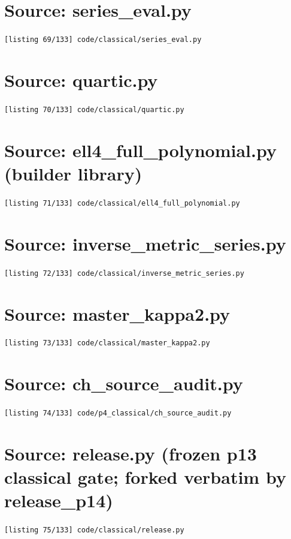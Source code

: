 \section{Source: series\_eval.py}
\noindent\texttt{[listing 69/133] code/classical/series\_eval.py}
{\scriptsize}

\section{Source: quartic.py}
\noindent\texttt{[listing 70/133] code/classical/quartic.py}
{\scriptsize}

\section{Source: ell4\_full\_polynomial.py (builder library)}
\noindent\texttt{[listing 71/133] code/classical/ell4\_full\_polynomial.py}
{\scriptsize}

\section{Source: inverse\_metric\_series.py}
\noindent\texttt{[listing 72/133] code/classical/inverse\_metric\_series.py}
{\scriptsize}

\section{Source: master\_kappa2.py}
\noindent\texttt{[listing 73/133] code/classical/master\_kappa2.py}
{\scriptsize}

\section{Source: ch\_source\_audit.py}
\noindent\texttt{[listing 74/133] code/p4\_classical/ch\_source\_audit.py}
{\scriptsize}

\section{Source: release.py (frozen p13 classical gate; forked verbatim by release\_p14)}
\noindent\texttt{[listing 75/133] code/classical/release.py}
{\scriptsize}


